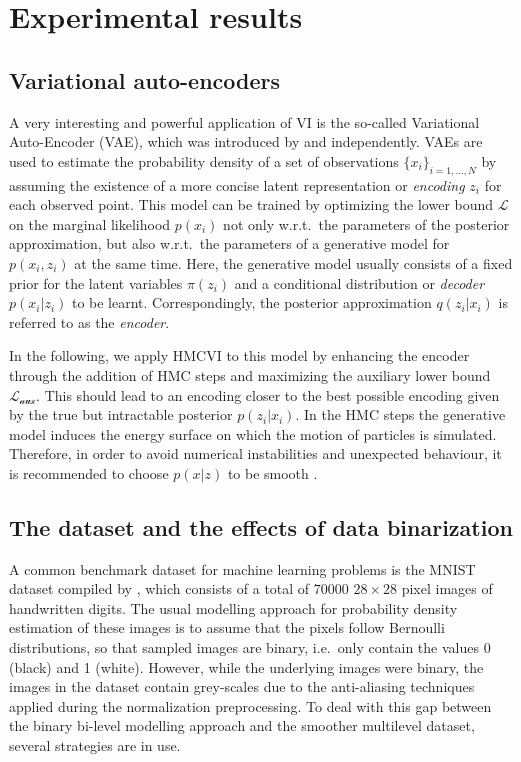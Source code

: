 \section{Experimental results}
\label{sec:Experiments}
\subsection{Variational auto-encoders}

A very interesting and powerful application of VI is the so-called Variational Auto-Encoder (VAE), which was introduced by \textcite{Kingma2014} and \textcite{Rezende2014} independently. VAEs are used to estimate the probability density of a set of observations $\{x_i\}_{i=1, \dots, N}$ by assuming the existence of a more concise latent representation or \textit{encoding} $z_i$ for each observed point. This model can be trained by optimizing the lower bound $\mathcal{L}$ on the marginal likelihood $p(x_i)$ not only w.r.t.\ the parameters of the posterior approximation, but also w.r.t.\ the parameters of a generative model for $p(x_i, z_i)$ at the same time. Here, the generative model usually consists of a fixed prior for the latent variables $\pi(z_i)$ and a conditional distribution or \textit{decoder} $p(x_i|z_i)$ to be learnt. Correspondingly, the posterior approximation $q(z_i|x_i)$ is referred to as the \textit{encoder}.

In the following, we apply HMCVI to this model by enhancing the encoder through the addition of HMC steps and maximizing the auxiliary lower bound $\mathcal{L_\textrm{aux}}$. This should lead to an encoding closer to the best possible encoding given by the true but intractable posterior $p(z_i|x_i)$. In the HMC steps the generative model induces the energy surface on which the motion of particles is simulated. Therefore, in order to avoid numerical instabilities and unexpected behaviour, it is recommended to choose $p(x|z)$ to be smooth .

\subsection{The dataset and the effects of data binarization}
\label{sec:Dataset}
A common benchmark dataset for machine learning problems is the MNIST dataset compiled by \textcite{LeCun1998}, which consists of a total of 70000 $28 \times 28$ pixel images of handwritten digits. The usual modelling approach for probability density estimation of these images is to assume that the pixels follow Bernoulli distributions, so that sampled images are binary, i.e.\ only contain the values 0 (black) and 1 (white). However, while the underlying images were binary, the images in the dataset contain grey-scales due to the anti-aliasing techniques applied during the normalization preprocessing. To deal with this gap between the binary bi-level modelling approach and the smoother multilevel dataset, several strategies are in use.

